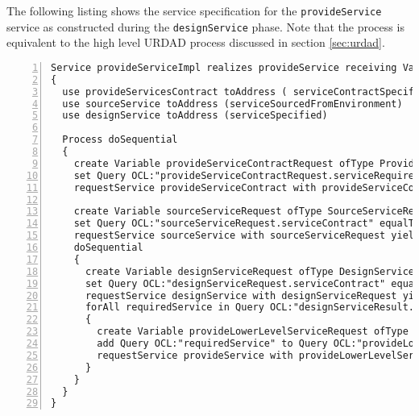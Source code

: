 The following listing shows the service specification for the \verb+provideService+ service as constructed during the \verb+designService+ phase. Note that the process is equivalent to the high level URDAD process discussed in section \ref{sec:urdad}.
\lstset{language=urdad,caption=Specifying the performAnalysis service in the textual URDAD DSL syntax.,label=serviceTextSyntax}
\begin{lstlisting}[numbers=left,escapechar=|]
Service provideServiceImpl realizes provideService receiving Variable provideServiceRequest ofType ProvideServiceRequest
{
  use provideServicesContract toAddress ( serviceContractSpecified serviceHasStakeHolders stakeholderRequirementsConsistent)
  use sourceService toAddress (serviceSourcedFromEnvironment)
  use designService toAddress (serviceSpecified)
        
  Process doSequential
  {
    create Variable provideServiceContractRequest ofType ProvideServiceContractRequest
    set Query OCL:"provideServiceContractRequest.serviceRequirements" equalTo Query OCL:"provideServiceRequest.serviceRequirements"
    requestService provideServiceContract with provideServiceContractRequest yielding Variable provideServiceContractResult ofType ProvideServiceContractResult raises (NoStakeholdersException InconsistentRequirementsException) 

    create Variable sourceServiceRequest ofType SourceServiceRequest
    set Query OCL:"sourceServiceRequest.serviceContract" equalTo Query OCL:"provideServiceContractResult.serviceContract"
    requestService sourceService with sourceServiceRequest yielding Variable sourceServiceResult ofType SourceServiceResult on NoRealizingServiceException
    doSequential
    {
      create Variable designServiceRequest ofType DesignServiceRequest
      set Query OCL:"designServiceRequest.serviceContract" equalTo Query OCL:"provideServiceContractResult.serviceContract"                
      requestService designService with designServiceRequest yielding Variable designServiceResult ofType DesignServiceResult
      forAll requiredService in Query OCL:"designServiceResult.service.requiredServices."
      {
        create Variable provideLowerLevelServiceRequest ofType ProvideServiceRequest
        add Query OCL:"requiredService" to Query OCL:"provideLowerLevelServiceRequest.serviceRequirements"
        requestService provideService with provideLowerLevelServiceRequest yielding variable provideLowerLevelServiceResult ofType ProvideServiceResult 
      } 
    } 
  }             
}
\end{lstlisting}

